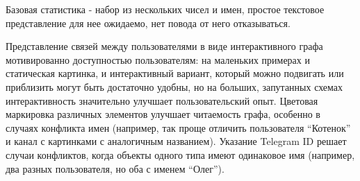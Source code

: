 Базовая статистика - набор из нескольких чисел и имен, простое текстовое представление для нее ожидаемо, нет повода от него отказываться.

Представление связей между пользователями в виде интерактивного графа мотивированно доступностью пользователям: на маленьких примерах и статическая картинка, и интерактивный вариант, который можно подвигать или приблизить могут быть достаточно удобны, но на больших, запутанных схемах интерактивность значительно улучшает пользовательский опыт.
Цветовая маркировка различных элементов улучшает читаемость графа, особенно в случаях конфликта имен (например, так проще отличить пользователя ``Котенок'' и канал с картинками с аналогичным названием).
Указание Telegram ID решает случаи конфликтов, когда объекты одного типа имеют одинаковое имя (например, два разных пользователя, но оба с именем ``Олег'').